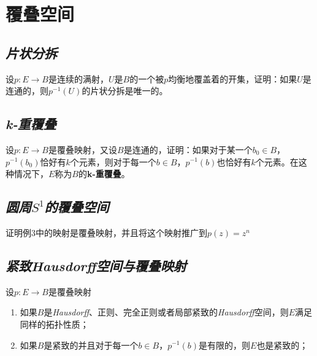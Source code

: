 \section{覆叠空间}

\subsection*{\textsl{片状分拆}}

\begin{mdframed}
    \begin{question}
        设$p:E\rightarrow B$是连续的满射，$U$是$B$的一个被$p$均衡地覆盖着的开集，证明：如果$U$是连通的，则$p^{-1}(U)$的片状分拆是唯一的。
    \end{question}
\end{mdframed}

\subsection*{\textsl{k-重覆叠}}

\begin{mdframed}
    \begin{question}
        设$p:E\rightarrow B$是覆叠映射，又设$B$是连通的，证明：如果对于某一个$b_0\in B$，$p^{-1}(b_0)$恰好有$k$个元素，则对于每一个$b\in B$，$p^{-1}(b)$也恰好有$k$个元素。在这种情况下，$E$称为$B$的\textbf{k-重覆叠}。
    \end{question}
\end{mdframed}

\subsection*{\textsl{圆周$S^1$的覆叠空间}}

\begin{mdframed}
    \begin{question}
        证明例3中的映射是覆叠映射，并且将这个映射推广到$p(z)=z^n$
    \end{question}
\end{mdframed}

\subsection*{\textsl{紧致Hausdorff空间与覆叠映射}}

\begin{mdframed}
    \begin{question}
        设$p:E\rightarrow B$是覆叠映射
        \begin{enumerate}[itemindent=2em]
            \item 如果$B$是\textsl{Hausdorff}、正则、完全正则或者局部紧致的\textsl{Hausdorff}空间，则$E$满足同样的拓扑性质；
            \item 如果$B$是紧致的并且对于每一个$b\in B$，$p^{-1}(b)$是有限的，则$E$也是紧致的；
        \end{enumerate}
    \end{question}
\end{mdframed}

